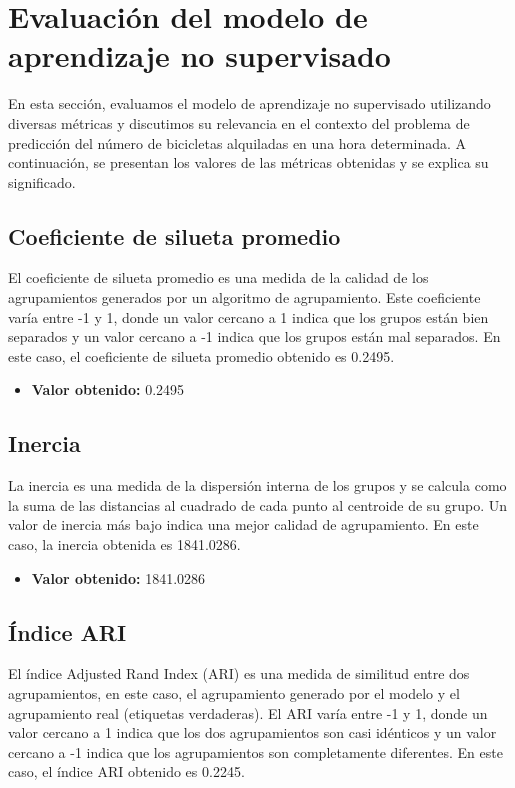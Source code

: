 \documentclass{wsdcr}
\begin{document}
\section{Evaluación del modelo de aprendizaje no supervisado}

En esta sección, evaluamos el modelo de aprendizaje no supervisado utilizando diversas métricas y discutimos su relevancia en el contexto del problema de predicción del número de bicicletas alquiladas en una hora determinada. A continuación, se presentan los valores de las métricas obtenidas y se explica su significado.

\subsection{Coeficiente de silueta promedio}

El coeficiente de silueta promedio es una medida de la calidad de los agrupamientos generados por un algoritmo de agrupamiento. Este coeficiente varía entre -1 y 1, donde un valor cercano a 1 indica que los grupos están bien separados y un valor cercano a -1 indica que los grupos están mal separados. En este caso, el coeficiente de silueta promedio obtenido es 0.2495.

\begin{itemize}
    \item \textbf{Valor obtenido:} 0.2495
\end{itemize}

\subsection{Inercia}

La inercia es una medida de la dispersión interna de los grupos y se calcula como la suma de las distancias al cuadrado de cada punto al centroide de su grupo. Un valor de inercia más bajo indica una mejor calidad de agrupamiento. En este caso, la inercia obtenida es 1841.0286.

\begin{itemize}
    \item \textbf{Valor obtenido:} 1841.0286
\end{itemize}

\subsection{Índice ARI}

El índice Adjusted Rand Index (ARI) es una medida de similitud entre dos agrupamientos, en este caso, el agrupamiento generado por el modelo y el agrupamiento real (etiquetas verdaderas). El ARI varía entre -1 y 1, donde un valor cercano a 1 indica que los dos agrupamientos son casi idénticos y un valor cercano a -1 indica que los agrupamientos son completamente diferentes. En este caso, el índice ARI obtenido es 0.2245.
\end{document}
